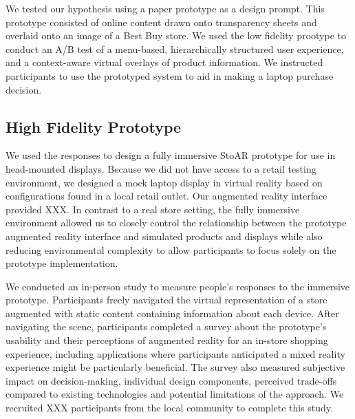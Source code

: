 We tested our hypothesis using a paper prototype as a design prompt. This prototype consisted of online content drawn onto transparency sheets and overlaid onto an image of a Best Buy store. We used the low fidelity prootype to conduct an A/B test of a menu-based, hierarchically structured user experience, and a context-aware virtual overlays of product information.   We instructed participants to use the prototyped system to aid in making a laptop purchase decision. 

\subsection{High Fidelity Prototype}
We used the responses to design a fully immersive StoAR prototype for use in head-mounted displays. Because we did not have access to a retail testing environment, we designed a mock laptop display in virtual reality based on configurations found in a local retail outlet. Our augmented reality interface provided XXX. In contrast to a real store setting, the fully immersive environment allowed us to closely control the relationship between the prototype augmented reality interface and simulated products and displays while also reducing environmental complexity to allow participants to focus solely on the prototype implementation. 

We conducted an in-person study to measure people's responses to the immersive prototype. Participants freely navigated the virtual representation of a store augmented with static content containing information about each device. 
After navigating the scene, participants completed a survey about the prototype's usability and their perceptions of augmented reality for an in-store shopping experience, including applications where participants anticipated a mixed reality experience might be particularly beneficial.  
The survey also measured subjective impact on decision-making, individual design components, perceived trade-offs compared to existing technologies and potential limitations of the approach. We recruited XXX participants from the local community to complete this study. 
